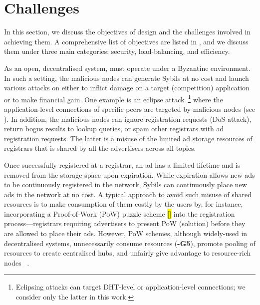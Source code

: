 \section{Challenges}
\label{sec:challenges}

In this section, we discuss the objectives of \sysname design and the challenges involved in achieving them. A comprehensive list of objectives are listed in , and we discuss them under three main categories: security, load-balancing, and efficiency. 

 As an open, decentralised system, \sysname must operate under a Byzantine environment. In such a setting, the malicious nodes can generate Sybils at no cost and launch various attacks on \sysname either to inflict damage on a target (\eg competition) application or to make financial gain. One example is an eclipse attack~\footnote{Eclipsing attacks can target DHT-level or application-level connections; we consider only the latter in this work.} where the application-level connections of specific peers are targeted by malicious nodes (see ). In addition, the malicious nodes can ignore registration requests (\ie DoS attack), return bogus results to lookup queries, or spam other registrars with ad registration requests. The latter is a misuse of the limited ad storage resources of registrars that is shared by all the advertisers across all topics.  

Once successfully registered at a registrar, an ad has a limited lifetime and is removed from the storage space upon expiration. While expiration allows new ads to be continuously registered in the network, Sybils can continuously place new ads in the network at no cost. A typical approach to avoid such misuse of shared resources is to make consumption of them costly by the users by, for instance, incorporating a Proof-of-Work (PoW) puzzle scheme \hl{[]} into the registration process---\eg registrars requiring advertisers to present PoW (\ie solution) before they are allowed to place their ads. However, PoW schemes, although widely-used in decentralised systems, unnecessarily consume resources (\textbf{-G5}), promote pooling of resources to create centralised hubs, and unfairly give advantage to resource-rich nodes ~\cite{gervais2014bitcoin}.


